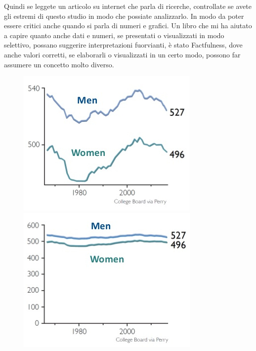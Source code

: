 \documentclass[12pt]{book} %
\begin{document}
Quindi se leggete un articolo su internet che parla di ricerche, controllate se avete gli estremi di questo studio in
modo che possiate analizzarlo. In modo da poter essere critici anche quando si parla di numeri e grafici. Un libro che mi ha aiutato a capire quanto anche dati e numeri, se presentati o visualizzati in modo selettivo, possano suggerire interpretazioni fuorvianti, è stato Factfulness, dove anche
valori corretti, se elaborarli o visualizzati in un certo modo, possono far assumere un concetto molto diverso.

\needspace{4cm}
\begin{figure}[H]
    \begin{minipage}{0.3\textwidth}
        \centering
        \includegraphics[width=\linewidth]{images/Libro-img003.jpg}
    \end{minipage}
    \hfill
    \begin{minipage}{0.3\textwidth}
        \centering
        \includegraphics[width=\linewidth]{images/Libro-img005.jpg}

\end{minipage}
\end{figure}
\end{document}
